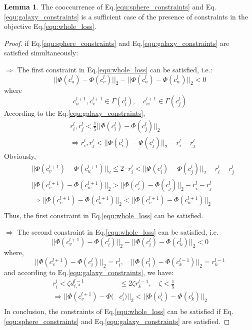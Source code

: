 \documentclass{article}
\theoremstyle{definition}
\newtheorem{lem}{Lemma}
\begin{document}
	 \begin{lem}
	 The cooccurrence of Eq.\ref{equ:sphere_constraints} and Eq.\ref{equ:galaxy_constraints} is a sufficient case of the presence of constraints in the objective Eq.\ref{equ:whole_loss}.
	 \end{lem}
	 \begin{proof}
	 if Eq.\ref{equ:sphere_constraints} and Eq.\ref{equ:galaxy_constraints} are satisfied simultaneously:

	 $\Rightarrow$ The first constraint in Eq.\ref{equ:whole_loss} can be satisfied, i.e.:
	 \[
	 	||\Phi(c_u^{l}) - \Phi(c_v^{l})||_2 - ||\Phi(c_u^{l}) - \Phi(c_w^{l})||_2 < 0
	 \]
	 where
	 \[
	 	c_u^{l+1}, c_v^{l+1} \in \Gamma{(c_i^l)}, \quad c_w^{l+1} \in \Gamma{(c_j^l)}
	 \]
	 According to the Eq.\ref{equ:galaxy_constraints},
	 \[
	 	\begin{split}
			&r_i^l, r_j^l < \frac{1}{5}||\Phi(c_i^{l}) - \Phi(c_j^{l})||_2 \\
		 	&\Rightarrow r_i^l, r_j^l < ||\Phi(c_i^{l}) - \Phi(c_j^{l})||_2 - r_i^l -r_j^l
		\end{split}
	 \]
	 Obviously,
	 \[
	 \begin{split}
	 &||\Phi(c_v^{l+1}) - \Phi(c_u^{l+1})||_2 \le 2 \cdot r_i^l < ||\Phi(c_i^{l}) - \Phi(c_j^{l})||_2-r_i^l-r_j^l \\
	 &||\Phi(c_v^{l+1}) - \Phi(c_w^{l+1})||_2 > ||\Phi(c_i^{l}) - \Phi(c_j^{l})||_2-r_i^l-r_j^l\\
	 &\Rightarrow ||\Phi(c_v^{l+1}) - \Phi(c_u^{l+1})||_2 < ||\Phi(c_v^{l+1}) - \Phi(c_w^{l+1})||_2\\
	 \end{split}
	 \]
	 Thus, the first constraint in Eq.\ref{equ:whole_loss} can be satisfied.

	 $\Rightarrow$ The second constraint in Eq.\ref{equ:whole_loss} can be satisfied, i.e.
	 \[
	 	||\Phi(c_v^{l+1}) - \Phi(c_i^{l})||_2 - ||\Phi(c_i^{l}) - \Phi(c_k^{l})||_2 < 0
	 \]
	 where,
	 \[
	 	||\Phi(c_v^{l+1}) - \Phi(c_i^{l})||_2 = r_i^l, \quad ||\Phi(c_i^l) - \Phi(c_k^{l-1})||_2 = r_k^{l-1}
	 \]
	 and according to Eq.\ref{equ:galaxy_constraints}, we have:
	 \[
	 	\begin{split}
	 	r_i^l < \zeta d_{i, *}^{l-1} &\leq 2\zeta r_k^{l-1}, \quad \zeta < \frac{1}{5} \\
	 	\Rightarrow ||\Phi(c_v^{l+1}) - \Phi(&c_i^{l})||_2 < ||\Phi(c_i^{l}) - \Phi(c_k^{l})||_2\\
	 	\end{split}
	 \]
	 In conclusion, the constraints of Eq.\ref{equ:whole_loss} can be satisfied if Eq.\ref{equ:sphere_constraints} and Eq.\ref{equ:galaxy_constraints} are satisfied.
	 \end{proof}
\end{document}
